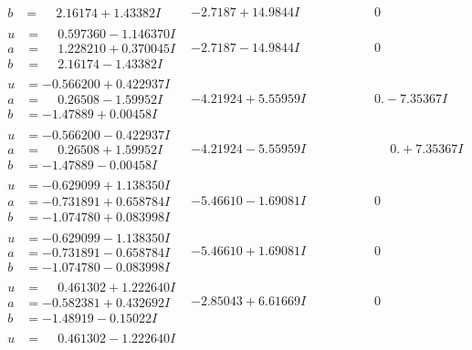 \documentclass[1p]{elsarticle_modified}
\theoremstyle{definition}
\begin{document}
$$\begin{array}{c|c|c}
\begin{aligned}
b &= \phantom{-}2.16174 + 1.43382 I\end{aligned}
 & -2.7187 + 14.9844 I & \phantom{-0.000000 } 0 \\ \hline\begin{aligned}
u &= \phantom{-}0.597360 - 1.146370 I \\
a &= \phantom{-}1.228210 + 0.370045 I \\
b &= \phantom{-}2.16174 - 1.43382 I\end{aligned}
 & -2.7187 - 14.9844 I & \phantom{-0.000000 } 0 \\ \hline\begin{aligned}
u &= -0.566200 + 0.422937 I \\
a &= \phantom{-}0.26508 - 1.59952 I \\
b &= -1.47889 + 0.00458 I\end{aligned}
 & -4.21924 + 5.55959 I & \phantom{-0.000000 } 0. - 7.35367 I \\ \hline\begin{aligned}
u &= -0.566200 - 0.422937 I \\
a &= \phantom{-}0.26508 + 1.59952 I \\
b &= -1.47889 - 0.00458 I\end{aligned}
 & -4.21924 - 5.55959 I & \phantom{-0.000000 -}0. + 7.35367 I \\ \hline\begin{aligned}
u &= -0.629099 + 1.138350 I \\
a &= -0.731891 + 0.658784 I \\
b &= -1.074780 + 0.083998 I\end{aligned}
 & -5.46610 - 1.69081 I & \phantom{-0.000000 } 0 \\ \hline\begin{aligned}
u &= -0.629099 - 1.138350 I \\
a &= -0.731891 - 0.658784 I \\
b &= -1.074780 - 0.083998 I\end{aligned}
 & -5.46610 + 1.69081 I & \phantom{-0.000000 } 0 \\ \hline\begin{aligned}
u &= \phantom{-}0.461302 + 1.222640 I \\
a &= -0.582381 + 0.432692 I \\
b &= -1.48919 - 0.15022 I\end{aligned}
 & -2.85043 + 6.61669 I & \phantom{-0.000000 } 0 \\ \hline\begin{aligned}
u &= \phantom{-}0.461302 - 1.222640 I \\

\end{aligned}
\end{array}$$
\end{document}
